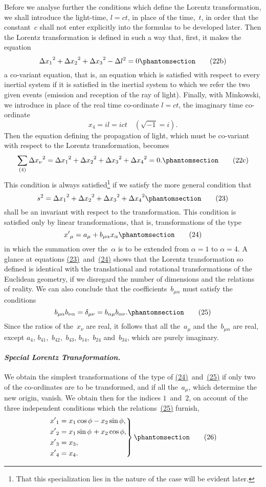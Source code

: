 \documentclass[12pt]{book}[2005/09/16]
\newcommand{\Paragraph}[1]{\paragraph*{\indent\normalfont\itshape#1}}
\newcommand{\Change}[2]{#2}
\newcommand{\Add}[1]{\Change{}{#1}}
\newcommand{\PageSep}[1]{\ignorespaces}
\newcommand{\Tag}[1]{%
  \phantomsection
  \label{eqn:#1}
  \tag*{#1}
}
\newcommand{\Eqref}[1]{\hyperref[eqn:#1]{#1}}
\begin{document}
Before we analyse further the conditions which define
the Lorentz transformation, we shall introduce the light-time,
%
$l = ct$, in place of the time,~$t$, in order that the
constant~$c$ shall not enter explicitly into the formulas to
be developed later. Then the Lorentz transformation is
defined in such a way that, first, it makes the equation
\[
{\Delta x_{1}}^{2} + {\Delta x_{2}}^{2} + {\Delta x_{3}}^{2} - \Delta l^{2} = 0
\Tag{(22b)}
\]
\PageSep{35}
a co-variant equation, that is, an equation which is satisfied
with respect to every inertial system if it is satisfied in
the inertial system to which we refer the two given events
(emission and reception of the ray of light). Finally,
with Minkowski, we introduce in place of the real time
co-ordinate $l = ct$, the imaginary time co-ordinate
\[
x_{4} = il = ict\quad (\sqrt{-1} = i).
\]
Then the equation defining the propagation of light,
which must be co-variant with respect to the Lorentz
transformation, becomes
\[
\sum_{(4)} {\Delta x_{\nu}}^{2}
  = {\Delta x_{1}}^{2} + {\Delta x_{2}}^{2} + {\Delta x_{3}}^{2} + {\Delta x_{4}}^{2}
  = 0\Add{.}
\Tag{(22c)}
\]
This condition is always satisfied\footnote
  {That this specialization lies in the nature of the case will be evident
  later.}
if we satisfy the more
general condition that
\[
s^{2} = {\Delta x_{1}}^{2} + {\Delta x_{2}}^{2} + {\Delta x_{3}}^{2} + {\Delta x_{4}}^{2}
\Tag{(23)}
\]
shall be an invariant with respect to the transformation.
This condition is satisfied only by linear transformations,
that is, transformations of the type
\[
{x'}_{\mu} = a_{\mu} + b_{\mu\alpha} x_{\alpha}
\Tag{(24)}
\]
in which the summation over the~$\alpha$ is to be extended
from $\alpha = 1$ to $\alpha = 4$. A glance at equations \Eqref{(23)}~and~\Eqref{(24)}
shows that the Lorentz transformation so defined is
identical with the translational and rotational transformations
of the Euclidean geometry, if we disregard the
number of dimensions and the relations of reality. We
\PageSep{36}
can also conclude that the coefficients~$b_{\mu\alpha}$ must satisfy the
conditions
\[
b_{\mu\alpha}b_{\nu\alpha} = \delta_{\mu\nu} = b_{\alpha\mu}b_{\alpha\nu}\Add{.}
\Tag{(25)}
\]
Since the ratios of the~$x_{\nu}$ are real, it follows that all the~$a_{\mu}$
and the~$b_{\mu\alpha}$ are real, except $a_{4}$, $b_{41}$,~$b_{42}$,~$b_{43}$, $b_{14}$,~$b_{24}$\Change{,}{} and~$b_{34}$,
which are purely imaginary.

\Paragraph{Special Lorentz Transformation.} We obtain the
%
simplest transformations of the type of \Eqref{(24)}~and~\Eqref{(25)} if
only two of the co-ordinates are to be transformed, and if
all the~$a_{\mu}$, which determine the new origin, vanish. We
obtain then for the indices $1$~and~$2$, on account of the
three independent conditions which the relations~\Eqref{(25)}
furnish,
\[
\left.
\begin{alignedat}{2}
{x'}_{1} &= x_{1} \cos\phi &&- x_{2} \sin\phi\Add{,} \\
{x'}_{2} &= x_{1} \sin\phi &&+ x_{2} \cos\phi\Add{,} \\
{x'}_{3} &= x_{3}\Add{,} && \\
{x'}_{4} &= x_{4}\Add{.} &&
\end{alignedat}
\right\}
\Tag{(26)}
\]
\end{document}
